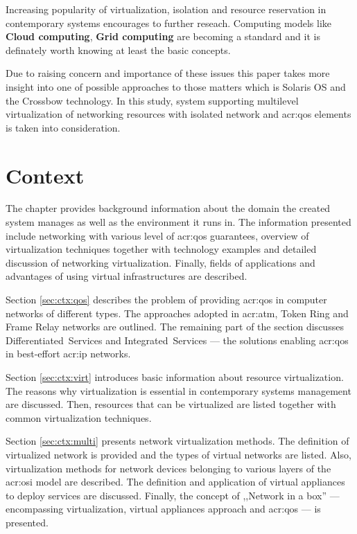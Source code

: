 \documentclass[11pt]{book}
\begin{document}
	
	Increasing popularity of virtualization, isolation and resource reservation in contemporary systems encourages to 
	further reseach. Computing models like \textbf{Cloud computing}, \textbf{Grid computing} are becoming a standard and it 
	is definately worth knowing at least the basic concepts.
	
	\medskip
	
	Due to raising concern and importance of these issues this paper takes more insight into one of 
	possible approaches	to those matters which is Solaris OS and the Crossbow technology. In this study, system supporting 
	multilevel virtualization of networking resources with isolated network and \gls{acr:qos} elements is taken into consideration.


  \chapter{Context}  %

    The chapter provides background information about the domain the created system manages as well as the environment
    it runs in. The information presented include networking with various level of \gls{acr:qos} guarantees, overview of
    virtualization techniques together with technology examples and detailed discussion of networking virtualization.
    Finally, fields of applications and advantages of using virtual infrastructures are described.

    Section \ref{sec:ctx:qos} describes the problem of providing \gls{acr:qos} in computer networks of different types.
    The approaches adopted in \gls{acr:atm}, Token Ring and Frame Relay networks are outlined. The remaining part of the
    section discusses Differentiated~Services and Integrated~Services --- the solutions enabling \gls{acr:qos} in
    best-effort \gls{acr:ip} networks.

    Section \ref{sec:ctx:virt} introduces basic information about resource virtualization. The reasons why
    virtualization is essential in contemporary systems management are discussed. Then, resources that can be
    virtualized are listed together with common virtualization techniques.

    Section \ref{sec:ctx:multi} presents network virtualization methods. The definition of virtualized network is
    provided and the types of virtual networks are listed. Also, virtualization methods for network devices belonging to
    various layers of the \gls{acr:osi} model are described. The definition and application of virtual appliances to
    deploy services are discussed. Finally, the concept of ,,Network in a box'' --- encompassing virtualization, virtual
    appliances approach and \gls{acr:qos} --- is presented.
\end{document}
